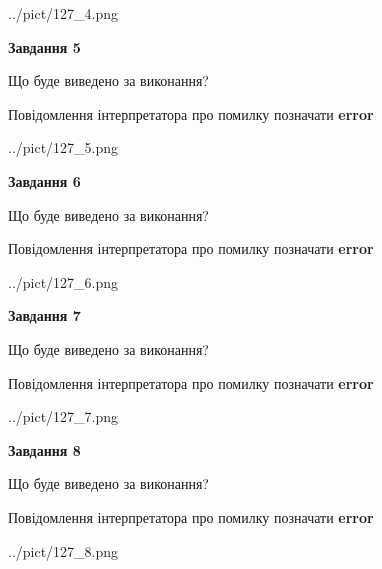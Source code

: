 \documentclass[12pt, ukrainian]{article}
\begin{document}
{\begin{center}
	{../pict/127_4.png}
\end{center}
\newpage

{\begin {center}\textbf{Завдання 5}\end {center}}\par
Що буде виведено за виконання? \par
Повідомлення інтерпретатора про помилку позначати \textbf{error}

\begin{center}
	{../pict/127_5.png}
\end{center}
\newpage

{\begin {center}\textbf{Завдання 6}\end {center}}\par
Що буде виведено за виконання? \par
Повідомлення інтерпретатора про помилку позначати \textbf{error}

\begin{center}
	{../pict/127_6.png}
\end{center}
\newpage

{\begin {center}\textbf{Завдання 7}\end {center}}\par
Що буде виведено за виконання? \par
Повідомлення інтерпретатора про помилку позначати \textbf{error}

\begin{center}
	{../pict/127_7.png}
\end{center}
\newpage

{\begin {center}\textbf{Завдання 8}\end {center}}\par
Що буде виведено за виконання? \par
Повідомлення інтерпретатора про помилку позначати \textbf{error}

\begin{center}
	{../pict/127_8.png}
\end{center}
\newpage

}
\end{document}
